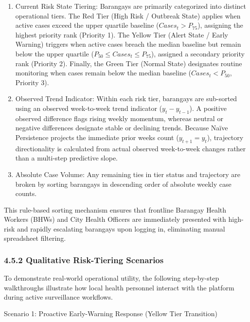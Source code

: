 \documentclass[
]{article}
\begin{document}
\begin{enumerate}
\def\labelenumi{\arabic{enumi}.}
\item
  Current Risk State Tiering: Barangays are primarily categorized into
  distinct operational tiers. The Red Tier (High Risk / Outbreak State)
  applies when active cases exceed the upper quartile baseline
  (\(Cases_{t} > P_{75}\)), assigning the highest priority rank
  (Priority 1). The Yellow Tier (Alert State / Early Warning) triggers
  when active cases breach the median baseline but remain below the
  upper quartile (\(P_{50} \leq Cases_{t} \leq P_{75}\)), assigned a
  secondary priority rank (Priority 2). Finally, the Green Tier (Normal
  State) designates routine monitoring when cases remain below the
  median baseline (\(Cases_{t} < P_{50}\), Priority 3).
\item
  Observed Trend Indicator: Within each risk tier, barangays are
  sub-sorted using an observed week-to-week trend indicator
  (\(y_{t} - y_{t - 1}\)). A positive observed difference flags rising
  weekly momentum, whereas neutral or negative differences designate
  stable or declining trends. Because Naïve Persistence projects the
  immediate prior week\textquotesingle s count (\(y_{t + 1} = y_{t}\)),
  trajectory directionality is calculated from actual observed
  week-to-week changes rather than a multi-step predictive slope.
\item
  Absolute Case Volume: Any remaining ties in tier status and trajectory
  are broken by sorting barangays in descending order of absolute weekly
  case counts.
\end{enumerate}

This rule-based sorting mechanism ensures that frontline Barangay Health
Workers (BHWs) and City Health Officers are immediately presented with
high-risk and rapidly escalating barangays upon logging in, eliminating
manual spreadsheet filtering.

\subsubsection{\texorpdfstring{\textbf{4.5.2 Qualitative Risk-Tiering
Scenarios}}{4.5.2 Qualitative Risk-Tiering Scenarios}}\label{qualitative-risk-tiering-scenarios}

To demonstrate real-world operational utility, the following
step-by-step walkthroughs illustrate how local health personnel interact
with the platform during active surveillance workflows.

Scenario 1: Proactive Early-Warning Response (Yellow Tier Transition)
\end{document}
